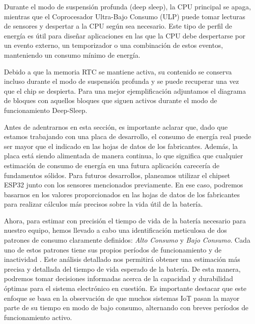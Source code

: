 Durante el modo de suspensión profunda (deep sleep), la CPU principal se apaga, mientras
que el Coprocesador Ultra-Bajo Consumo (ULP) puede tomar lecturas de sensores y
despertar a la CPU según sea necesario. Este tipo de perfil de energía es útil para
diseñar aplicaciones en las que la CPU debe despertarse por un evento externo, un
temporizador o una combinación de estos eventos, manteniendo un consumo mínimo de
energía.

Debido a que la memoria RTC se mantiene activa, su contenido se conserva incluso durante
el modo de suspensión profunda y se puede recuperar una vez que el chip se despierta.
Para una mejor ejemplificación adjuntamos el diagrama de bloques con aquellos bloques
que siguen activos durante el modo de funcionamiento Deep-Sleep.


Antes de adentrarnos en esta sección, es importante aclarar que, dado que estamos trabajando con una placa de desarrollo, el consumo de energía real puede ser mayor que el indicado en las hojas de datos de los fabricantes. Además, la placa está siendo alimentada de manera continua, lo que significa que cualquier estimación de consumo de energía en una futura aplicación carecería de fundamentos sólidos. Para futuros desarrollos, planeamos utilizar el chipset ESP32 junto con los sensores mencionados previamente. En ese caso, podremos basarnos en los valores proporcionados en las hojas de datos de los fabricantes para realizar cálculos más precisos sobre la vida útil de la batería.

Ahora, para estimar con precisión el tiempo de vida de la batería necesario para nuestro equipo, hemos llevado a cabo una identificación meticulosa de dos patrones de consumo claramente definidos: \textit{Alto Consumo} y \textit{Bajo Consumo}. Cada uno de estos patrones tiene sus propios períodos de funcionamiento  y de inactividad . Este análisis detallado nos permitirá obtener una estimación más precisa y detallada del tiempo de vida esperado de la batería. De esta manera, podremos tomar decisiones informadas acerca de la capacidad y durabilidad óptimas para el sistema electrónico en cuestión. Es importante destacar que este enfoque se basa en la observación de que muchos sistemas IoT pasan la mayor parte de su tiempo en modo de bajo consumo, alternando con breves períodos de funcionamiento activo.

